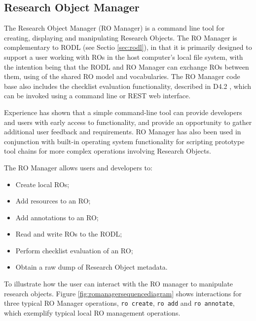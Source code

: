 \subsection{Research Object Manager}
\label{sec:romanager}


The Research Object Manager (RO Manager) is a command line tool for creating, displaying and manipulating Research Objects. The RO Manager is complementary to RODL (see Sectio \ref{sec:rodl}), in that it is primarily designed to support a user working with ROs in the host computer's local file system, with the intention being that the RODL and RO Manager can exchange ROs between them, using of the shared RO model and vocabularies.  The RO Manager code base also includes the checklist evaluation functionality, described in D4.2 \cite{D4.2v2}, which can be invoked using a command line or REST web interface.

Experience has shown that a simple command-line tool can provide developers and users with early access to functionality, and provide an opportunity to gather additional user feedback and requirements.  RO Manager has also been used in conjunction with built-in operating system functionality for scripting prototype tool chains for more complex operations involving Research Objects.

The RO Manager allows users and developers to:

\begin{itemize}

\item Create local ROs;
\item Add resources to an RO;
\item Add annotations to an RO;
\item Read and write ROs to the RODL;
\item Perform checklist evaluation of an RO;
\item Obtain a raw dump of Research Object metadata.
\end{itemize}

To illustrate how the user can interact with the RO manager to manipulate research objects. Figure \ref{fig:romanagersequencediagram} shows interactions for three typical RO Manager operations, \texttt{ro create}, \texttt{ro add} and
\texttt{ro annotate}, which exemplify typical local RO management operations.

